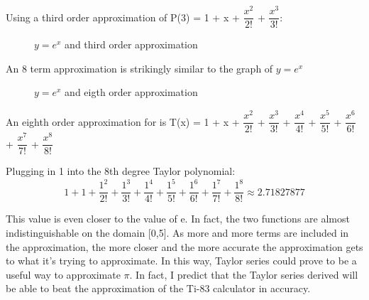 \documentclass[12pt, titlepage]{article}
\begin{document}
Using a third order approximation of P(3) = 1 + x + \(\dfrac{x^{2}}{2!}\) + \(\dfrac{x^{3}}{3!}\):
\begin{figure}[H]
\centering
    \caption[]{\(y=e^x\) and third order approximation}
\end{figure}

An 8 term approximation is strikingly similar to the graph of \(y = e^{x}\)
\begin{figure}[H]
\centering
    \caption[]{\(y=e^x\) and eigth order approximation}
\end{figure}

An eighth order approximation for is T(x) = 1 + x + \(\dfrac{x^2}{2!}\) + \(\dfrac{x^3}{3!}\)
+ \(\dfrac{x^4}{4!}\) + \(\dfrac{x^5}{5!}\) + \(\dfrac{x^6}{6!}\) + \(\dfrac{x^7}{7!}\) + \(\dfrac{x^8}{8!}\)

Plugging in 1 into the 8th degree Taylor polynomial:
\begin{equation}
  1 + 1 + \dfrac{1^2}{2!} + \dfrac{1^3}{3!} + \dfrac{1^4}{4!} + \dfrac{1^5}{5!} + \dfrac{1^6}{6!} + \dfrac{1^7}{7!} + \dfrac{1^8}{8!} \approx 2.71827877
\end{equation}

This value is even closer to the value of e. In fact, the two functions are almost indistinguishable on the domain [0,5]. As more and more terms are included in the approximation, the more closer and the more accurate the approximation gets to what it's trying to approximate. In this way, Taylor series could prove to be a useful way to approximate \(\pi\). In fact, I predict that the Taylor series derived  will be able to beat the approximation of the Ti-83 calculator in accuracy.
\end{document}
